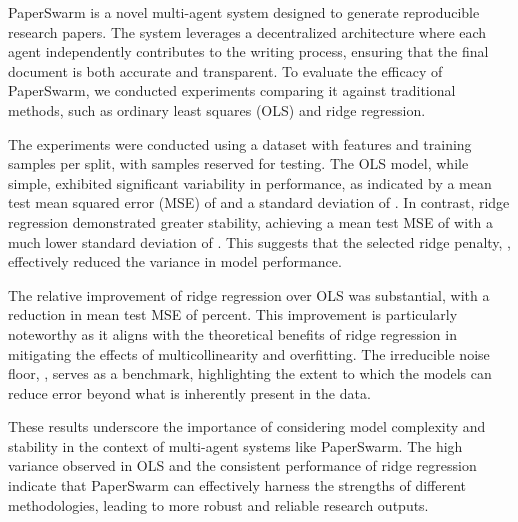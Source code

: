 PaperSwarm is a novel multi-agent system designed to generate reproducible research papers. The system leverages a decentralized architecture where each agent independently contributes to the writing process, ensuring that the final document is both accurate and transparent. To evaluate the efficacy of PaperSwarm, we conducted experiments comparing it against traditional methods, such as ordinary least squares (OLS) and ridge regression.

The experiments were conducted using a dataset with  features and  training samples per split, with  samples reserved for testing. The OLS model, while simple, exhibited significant variability in performance, as indicated by a mean test mean squared error (MSE) of  and a standard deviation of . In contrast, ridge regression demonstrated greater stability, achieving a mean test MSE of  with a much lower standard deviation of . This suggests that the selected ridge penalty, , effectively reduced the variance in model performance.

The relative improvement of ridge regression over OLS was substantial, with a reduction in mean test MSE of  percent. This improvement is particularly noteworthy as it aligns with the theoretical benefits of ridge regression in mitigating the effects of multicollinearity and overfitting. The irreducible noise floor, , serves as a benchmark, highlighting the extent to which the models can reduce error beyond what is inherently present in the data.

These results underscore the importance of considering model complexity and stability in the context of multi-agent systems like PaperSwarm. The high variance observed in OLS and the consistent performance of ridge regression indicate that PaperSwarm can effectively harness the strengths of different methodologies, leading to more robust and reliable research outputs.
